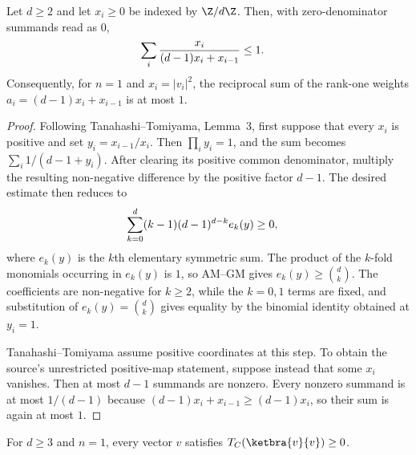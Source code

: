 \begin{lemma}
    \label{lem:choi_type_first_cyclic_reciprocal}
    \leanok
    Let $d\ge2$ and let $x_i\ge0$ be indexed by $\Z/d\Z$. Then, with
    zero-denominator summands read as $0$,
    \begin{align}
        \sum_i\frac{x_i}{(d-1)x_i+x_{i-1}}
         & \le1.
        \notag
    \end{align}
    Consequently, for $n=1$ and $x_i=|v_i|^2$, the reciprocal sum of the
    rank-one weights $a_i=(d-1)x_i+x_{i-1}$ is at most $1$.
\end{lemma}

\begin{proof}
    \leanok
    Following Tanahashi--Tomiyama, Lemma~3, first suppose that every $x_i$ is
    positive and set
    $y_i=x_{i-1}/x_i$. Then $\prod_i y_i=1$, and the sum becomes
    $\sum_i 1/(d-1+y_i)$. After clearing its positive common denominator,
    multiply the resulting non-negative difference by the positive factor
    $d-1$. The desired estimate then reduces to
    \begin{align}
        \sum_{k=0}^{d}(k-1)(d-1)^{d-k}e_k(y)
         & \ge0,
        \notag
    \end{align}
    where $e_k(y)$ is the $k$th elementary symmetric sum. The product of the
    $k$-fold monomials occurring in $e_k(y)$ is $1$, so AM--GM gives
    $e_k(y)\ge\binom{d}{k}$. The coefficients are non-negative for $k\ge2$,
    while the $k=0,1$ terms are fixed, and substitution of
    $e_k(y)=\binom{d}{k}$ gives equality by the binomial identity obtained at
    $y_i=1$.

    Tanahashi--Tomiyama assume positive coordinates at this step. To obtain the
    source's unrestricted positive-map statement, suppose instead that some
    $x_i$ vanishes. Then at most $d-1$ summands are nonzero. Every nonzero
    summand is at most $1/(d-1)$ because
    $(d-1)x_i+x_{i-1}\ge(d-1)x_i$, so their sum is again at most $1$.
\end{proof}

\begin{lemma}
    \label{lem:choi_type_rankone_positive_bottom}
    \leanok
    For $d\ge3$ and $n=1$, every vector $v$ satisfies
    $T_C(\ketbra{v}{v})\ge0$.
\end{lemma}

